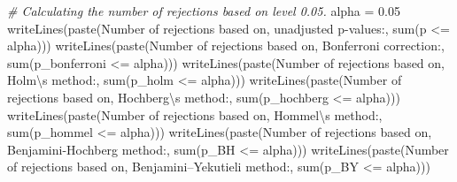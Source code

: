 \documentclass[
]{book}
\newenvironment{Shaded}{\begin{snugshade}}{\end{snugshade}}
\newcommand{\CommentTok}[1]{\textcolor[rgb]{0.56,0.35,0.01}{\textit{#1}}}
\newcommand{\FloatTok}[1]{\textcolor[rgb]{0.00,0.00,0.81}{#1}}
\newcommand{\FunctionTok}[1]{\textcolor[rgb]{0.00,0.00,0.00}{#1}}
\newcommand{\NormalTok}[1]{#1}
\newcommand{\OtherTok}[1]{\textcolor[rgb]{0.56,0.35,0.01}{#1}}
\newcommand{\SpecialCharTok}[1]{\textcolor[rgb]{0.00,0.00,0.00}{#1}}
\newcommand{\StringTok}[1]{\textcolor[rgb]{0.31,0.60,0.02}{#1}}
\begin{document}
\begin{Shaded}
\begin{Highlighting}[]
\CommentTok{\# Calculating the number of rejections based on level 0.05.}
\NormalTok{alpha }\OtherTok{=} \FloatTok{0.05}
\FunctionTok{writeLines}\NormalTok{(}\FunctionTok{paste}\NormalTok{(}\StringTok{\textquotesingle{}Number of rejections based on\textquotesingle{}}\NormalTok{,}
                 \StringTok{\textquotesingle{}unadjusted p{-}values:\textquotesingle{}}\NormalTok{, }\FunctionTok{sum}\NormalTok{(p }\SpecialCharTok{\textless{}=}\NormalTok{ alpha)))}
\FunctionTok{writeLines}\NormalTok{(}\FunctionTok{paste}\NormalTok{(}\StringTok{\textquotesingle{}Number of rejections based on\textquotesingle{}}\NormalTok{,}
                 \StringTok{\textquotesingle{}Bonferroni correction:\textquotesingle{}}\NormalTok{,}
                 \FunctionTok{sum}\NormalTok{(p\_bonferroni }\SpecialCharTok{\textless{}=}\NormalTok{ alpha)))}
\FunctionTok{writeLines}\NormalTok{(}\FunctionTok{paste}\NormalTok{(}\StringTok{\textquotesingle{}Number of rejections based on\textquotesingle{}}\NormalTok{,}
                 \StringTok{\textquotesingle{}Holm}\SpecialCharTok{\textbackslash{}\textquotesingle{}}\StringTok{s method:\textquotesingle{}}\NormalTok{,}
                 \FunctionTok{sum}\NormalTok{(p\_holm }\SpecialCharTok{\textless{}=}\NormalTok{ alpha)))}
\FunctionTok{writeLines}\NormalTok{(}\FunctionTok{paste}\NormalTok{(}\StringTok{\textquotesingle{}Number of rejections based on\textquotesingle{}}\NormalTok{,}
                 \StringTok{\textquotesingle{}Hochberg}\SpecialCharTok{\textbackslash{}\textquotesingle{}}\StringTok{s method:\textquotesingle{}}\NormalTok{,}
                 \FunctionTok{sum}\NormalTok{(p\_hochberg }\SpecialCharTok{\textless{}=}\NormalTok{ alpha)))}
\FunctionTok{writeLines}\NormalTok{(}\FunctionTok{paste}\NormalTok{(}\StringTok{\textquotesingle{}Number of rejections based on\textquotesingle{}}\NormalTok{,}
                 \StringTok{\textquotesingle{}Hommel}\SpecialCharTok{\textbackslash{}\textquotesingle{}}\StringTok{s method:\textquotesingle{}}\NormalTok{,}
                 \FunctionTok{sum}\NormalTok{(p\_hommel }\SpecialCharTok{\textless{}=}\NormalTok{ alpha)))}
\FunctionTok{writeLines}\NormalTok{(}\FunctionTok{paste}\NormalTok{(}\StringTok{\textquotesingle{}Number of rejections based on\textquotesingle{}}\NormalTok{,}
                 \StringTok{\textquotesingle{}Benjamini{-}Hochberg method:\textquotesingle{}}\NormalTok{,}
                 \FunctionTok{sum}\NormalTok{(p\_BH }\SpecialCharTok{\textless{}=}\NormalTok{ alpha)))}
\FunctionTok{writeLines}\NormalTok{(}\FunctionTok{paste}\NormalTok{(}\StringTok{\textquotesingle{}Number of rejections based on\textquotesingle{}}\NormalTok{,}
                 \StringTok{\textquotesingle{}Benjamini–Yekutieli method:\textquotesingle{}}\NormalTok{,}
                 \FunctionTok{sum}\NormalTok{(p\_BY }\SpecialCharTok{\textless{}=}\NormalTok{ alpha)))}
\end{Highlighting}
\end{Shaded}
\end{document}
